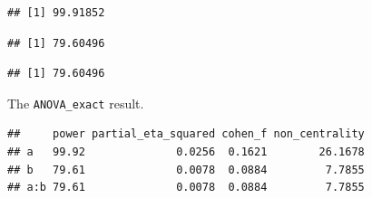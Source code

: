 \documentclass[]{book}
\newenvironment{Shaded}{\begin{snugshade}}{\end{snugshade}}
\newcommand{\DataTypeTok}[1]{\textcolor[rgb]{0.13,0.29,0.53}{#1}}
\newcommand{\KeywordTok}[1]{\textcolor[rgb]{0.13,0.29,0.53}{\textbf{#1}}}
\newcommand{\NormalTok}[1]{#1}
\newcommand{\OperatorTok}[1]{\textcolor[rgb]{0.81,0.36,0.00}{\textbf{#1}}}
\newcommand{\OtherTok}[1]{\textcolor[rgb]{0.56,0.35,0.01}{#1}}
\newcommand{\StringTok}[1]{\textcolor[rgb]{0.31,0.60,0.02}{#1}}
\begin{document}
\begin{Shaded}
\end{Shaded}

\begin{verbatim}
## [1] 99.91852
\end{verbatim}

\begin{Shaded}
\end{Shaded}

\begin{verbatim}
## [1] 79.60496
\end{verbatim}

\begin{Shaded}
\end{Shaded}

\begin{verbatim}
## [1] 79.60496
\end{verbatim}

The \texttt{ANOVA\_exact} result.

\begin{Shaded}
\end{Shaded}

\begin{verbatim}
##     power partial_eta_squared cohen_f non_centrality
## a   99.92              0.0256  0.1621        26.1678
## b   79.61              0.0078  0.0884         7.7855
## a:b 79.61              0.0078  0.0884         7.7855
\end{verbatim}
\end{document}
